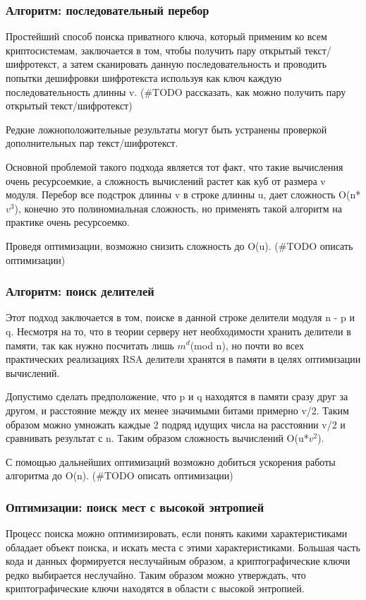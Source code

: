 \documentclass[20pt]{article}
\begin{document}
\subsubsection{Алгоритм: последовательный перебор}
Простейший способ поиска приватного ключа, который применим ко всем
криптосистемам, заключается в том, чтобы получить пару открытый текст/шифротекст,
а затем сканировать данную последовательность и проводить попытки дешифровки
шифротекста используя как ключ каждую последовательность длинны v. (\#TODO рассказать,
как можно получить пару открытый текст/шифротекст)

Редкие ложноположительные результаты могут быть устранены проверкой
дополнительных пар текст/шифротекст.

Основной проблемой такого подхода является тот факт, что такие вычисления очень
ресурсоемкие, а сложность вычислений растет как куб от размера v модуля.
Перебор все подстрок длинны v в строке длинны u, дает сложность O(n*$v^3$),
конечно это полиномиальная сложность, но применять такой алгоритм на практике
очень ресурсоемко.

Проведя оптимизации, возможно снизить сложность до O(u). (\#TODO описать оптимизации)

\subsubsection{Алгоритм: поиск делителей}
Этот подход заключается в том, поиске в данной строке делители модуля n - p и q.
Несмотря на то, что в теории серверу нет необходимости хранить делители в
памяти, так как нужно посчитать лишь $m^d$(mod n), но почти во всех практических
реализациях RSA делители хранятся в памяти в целях оптимизации вычислений.

Допустимо сделать предположение, что p и q находятся в памяти сразу друг за другом,
и расстояние между их менее значимыми битами примерно v/2. Таким образом можно
умножать каждые 2 подряд идущих числа на расстоянии v/2 и сравнивать результат с
n. Таким образом сложность вычислений O(u*$v^2$).

С помощью дальнейших оптимизаций возможно добиться ускорения работы алгоритма
до O(n). (\#TODO описать оптимизации)

\subsubsection{Оптимизации: поиск мест с высокой энтропией}
Процесс поиска можно оптимизировать, если понять какими характеристиками обладает
объект поиска, и искать места с этими характеристиками. Большая часть кода и данных
формируется неслучайным образом, а криптографические ключи редко выбирается
неслучайно. Таким образом можно утверждать, что криптографические ключи находятся
в области с высокой энтропией.
\end{document}
